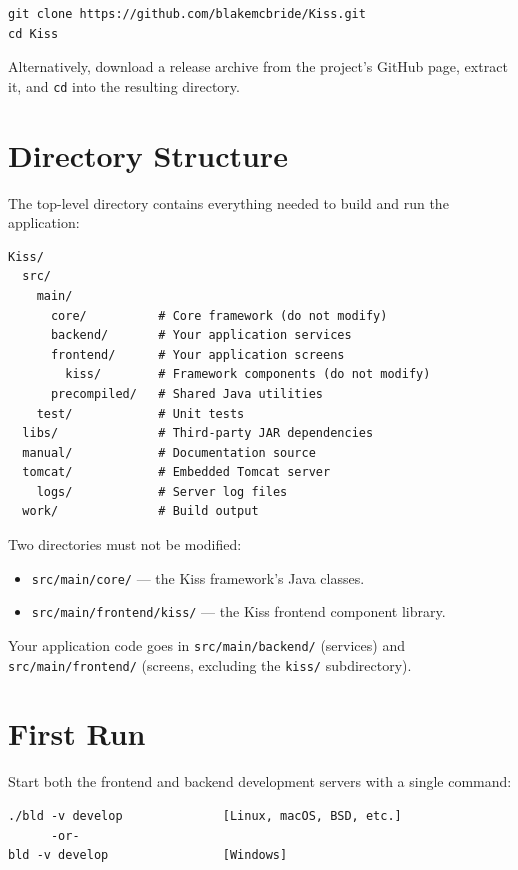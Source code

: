 \begin{lstlisting}[style=shell]
git clone https://github.com/blakemcbride/Kiss.git
cd Kiss
\end{lstlisting}

\noindent
Alternatively, download a release archive from the project's GitHub page, extract it, and \texttt{cd} into the resulting directory.

\section{Directory Structure}
\label{sec:setup-directory}

The top-level directory contains everything needed to build and run the application:

\begin{lstlisting}
Kiss/
  src/
    main/
      core/          # Core framework (do not modify)
      backend/       # Your application services
      frontend/      # Your application screens
        kiss/        # Framework components (do not modify)
      precompiled/   # Shared Java utilities
    test/            # Unit tests
  libs/              # Third-party JAR dependencies
  manual/            # Documentation source
  tomcat/            # Embedded Tomcat server
    logs/            # Server log files
  work/              # Build output
\end{lstlisting}

\begin{warnbox}
Two directories must not be modified:
\begin{itemize}
  \item \texttt{src/main/core/} --- the Kiss framework's Java classes.
  \item \texttt{src/main/frontend/kiss/} --- the Kiss frontend component library.
\end{itemize}
Your application code goes in \texttt{src/main/backend/} (services) and \texttt{src/main/frontend/} (screens, excluding the \texttt{kiss/} subdirectory).
\end{warnbox}

\section{First Run}
\label{sec:setup-first-run}

Start both the frontend and backend development servers with a single command:

\begin{lstlisting}[style=shell]
./bld -v develop              [Linux, macOS, BSD, etc.]
      -or-
bld -v develop                [Windows]
\end{lstlisting}

